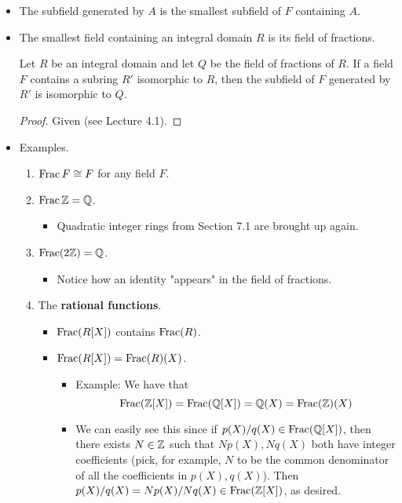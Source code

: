\documentclass[../notes.tex]{subfiles}
\begin{document}
\begin{itemize}
    \item The subfield generated by $A$ is the smallest subfield of $F$ containing $A$.
    \item The smallest field containing an integral domain $R$ is its field of fractions.
    \begin{corollary}\label{cly:7.16}
        Let $R$ be an integral domain and let $Q$ be the field of fractions of $R$. If a field $F$ contains a subring $R'$ isomorphic to $R$, then the subfield of $F$ generated by $R'$ is isomorphic to $Q$.
        \begin{proof}
            Given (see Lecture 4.1).
        \end{proof}
    \end{corollary}
    \item Examples.
    \begin{enumerate}
        \item $\operatorname{Frac} F\cong F$ for any field $F$.
        \item $\operatorname{Frac}\mathbb{Z}=\mathbb{Q}$.
        \begin{itemize}
            \item Quadratic integer rings from Section 7.1 are brought up again.
        \end{itemize}
        \item $\operatorname{Frac}(2\mathbb{Z})=\mathbb{Q}$.
        \begin{itemize}
            \item Notice how an identity "appears" in the field of fractions.
        \end{itemize}
        \item The \textbf{rational functions}.
        \begin{itemize}
            \item $\operatorname{Frac}(R[X])$ contains $\operatorname{Frac}(R)$.
            \item $\operatorname{Frac}(R[X])=\operatorname{Frac}(R)(X)$.
            \begin{itemize}
                \item Example: We have that
                \begin{equation*}
                    \operatorname{Frac}(\mathbb{Z}[X]) = \operatorname{Frac}(\mathbb{Q}[X])
                    = \mathbb{Q}(X)
                    = \operatorname{Frac}(\mathbb{Z})(X)
                \end{equation*}
                \item We can easily see this since if $p(X)/q(X)\in\operatorname{Frac}(\mathbb{Q}[X])$, then there exists $N\in\mathbb{Z}$ such that $Np(X),Nq(X)$ both have integer coefficients (pick, for example, $N$ to be the common denominator of all the coefficients in $p(X),q(X)$). Then $p(X)/q(X)=Np(X)/Nq(X)\in\operatorname{Frac}(\mathbb{Z}[X])$, as desired.

\end{itemize}
\end{itemize}
\end{enumerate}
\end{itemize}
\end{document}
